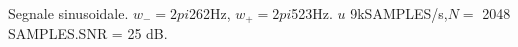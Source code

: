 Segnale sinusoidale. $w_{-}=2pi$262Hz, $w_{+}=2pi$523Hz. $
u$ 9kSAMPLES/s,$N=$ 2048 SAMPLES.SNR = 25 dB.